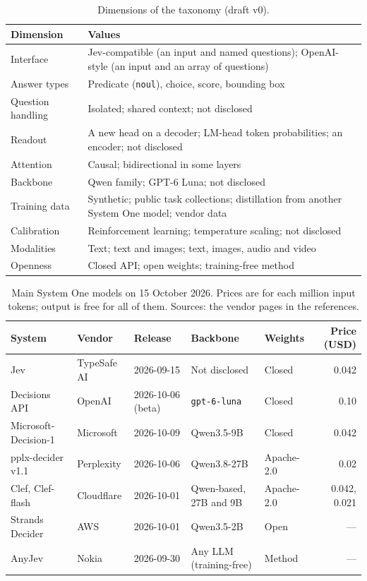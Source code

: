\documentclass[acmsmall,nonacm,screen]{acmart}
\newcommand{\sone}{System One model\xspace}
\newcommand{\sones}{System One models\xspace}
\begin{document}
\begin{table}[t]
  \caption{Dimensions of the taxonomy (draft v0).}
  \label{tab:taxonomy}
  \small
  \begin{tabularx}{\linewidth}{@{}lX@{}}
    \toprule
    Dimension & Values \\
    \midrule
    Interface & Jev-compatible (an input and named questions); OpenAI-style (an input and an array of questions) \\
    Answer types & Predicate (\texttt{noul}), choice, score, bounding box \\
    Question handling & Isolated; shared context; not disclosed \\
    Readout & A new head on a decoder; LM-head token probabilities; an encoder; not disclosed \\
    Attention & Causal; bidirectional in some layers \\
    Backbone & Qwen family; GPT-6 Luna; not disclosed \\
    Training data & Synthetic; public task collections; distillation from another \sone; vendor data \\
    Calibration & Reinforcement learning; temperature scaling; not disclosed \\
    Modalities & Text; text and images; text, images, audio and video \\
    Openness & Closed API; open weights; training-free method \\
    \bottomrule
  \end{tabularx}
\end{table}

\begin{table}[t]
  \caption{Main \sones on 15 October 2026. Prices are for each million input tokens; output is free for all of them. Sources: the vendor pages in the references.}
  \label{tab:systems}
  \small
  \begin{tabularx}{\linewidth}{@{}lll>{\raggedright\arraybackslash}Xlr@{}}
    \toprule
    System & Vendor & Release & Backbone & Weights & Price (USD) \\
    \midrule
    Jev~\cite{typesafe2026introducing} & TypeSafe AI & 2026-09-15 & Not disclosed & Closed & 0.042 \\
    Decisions API~\cite{openai2026decisions} & OpenAI & 2026-10-06 (beta) & \texttt{gpt-6-luna} & Closed & 0.10 \\
    Microsoft-Decision-1~\cite{microsoft2026decision1} & Microsoft & 2026-10-09 & Qwen3.5-9B & Closed & 0.042 \\
    pplx-decider v1.1~\cite{perplexity2026decider} & Perplexity & 2026-10-06 & Qwen3.8-27B & Apache-2.0 & 0.02 \\
    Clef, Clef-flash~\cite{cloudflare2026clef} & Cloudflare & 2026-10-01 & Qwen-based, 27B and 9B & Apache-2.0 & 0.042, 0.021 \\
    Strands Decider~\cite{aws2026strands} & AWS & 2026-10-01 & Qwen3.5-2B & Open & --- \\
    AnyJev~\cite{zhang2026anyjev} & Nokia & 2026-09-30 & Any LLM (training-free) & Method & --- \\
    \bottomrule
  \end{tabularx}
\end{table}
\end{document}
